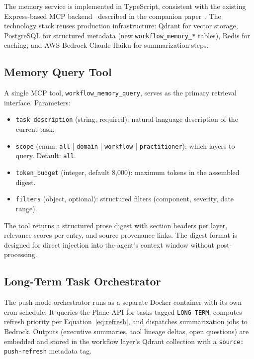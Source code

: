 \documentclass[11pt]{article}
\begin{document}
The memory service is implemented in TypeScript, consistent with the existing Express-based MCP backend~\citep{anthropic2024mcp} described in the companion paper~\citep[\S7]{ovcharov2026recursive}.
The technology stack reuses production infrastructure: Qdrant for vector storage, PostgreSQL for structured metadata (new \texttt{workflow\_memory\_*} tables), Redis for caching, and AWS Bedrock Claude Haiku for summarization steps.

\subsection{Memory Query Tool}
\label{sec:memory-query-tool}

A single MCP tool, \texttt{workflow\_memory\_query}, serves as the primary retrieval interface.
Parameters:

\begin{itemize}[leftmargin=*, nosep]
  \item \texttt{task\_description} (string, required): natural-language description of the current task.
  \item \texttt{scope} (enum: \texttt{all} | \texttt{domain} | \texttt{workflow} | \texttt{practitioner}): which layers to query. Default: \texttt{all}.
  \item \texttt{token\_budget} (integer, default 8{,}000): maximum tokens in the assembled digest.
  \item \texttt{filters} (object, optional): structured filters (component, severity, date range).
\end{itemize}

The tool returns a structured prose digest with section headers per layer, relevance scores per entry, and source provenance links.
The digest format is designed for direct injection into the agent's context window without post-processing.

\subsection{Long-Term Task Orchestrator}
\label{sec:orchestrator}

The push-mode orchestrator runs as a separate Docker container with its own cron schedule.
It queries the Plane API for tasks tagged \texttt{LONG-TERM}, computes refresh priority per Equation~\ref{eq:refresh}, and dispatches summarization jobs to Bedrock.
Outputs (executive summaries, tool lineage deltas, open questions) are embedded and stored in the workflow layer's Qdrant collection with a \texttt{source: push-refresh} metadata tag.
\end{document}
